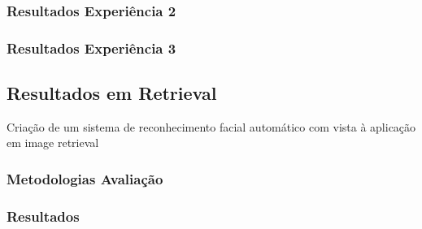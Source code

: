 \subsubsection{Resultados Experiência 2}

\subsubsection{Resultados Experiência 3}


\subsection{Resultados em Retrieval} \label{sec:avaliacao2}
Criação de um sistema de reconhecimento facial automático com vista à aplicação em image retrieval

\subsubsection{Metodologias Avaliação}

\subsubsection{Resultados}

